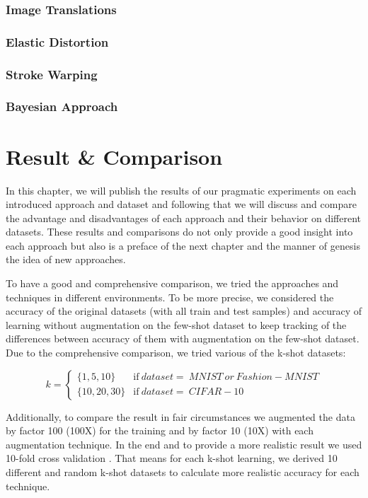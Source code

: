 \subsection{Image Translations}
\subsection{Elastic Distortion}
\subsection{Stroke Warping}
\subsection{Bayesian Approach}


\chapter{Result \& Comparison}
\label{tit:results}
In this chapter, we will publish the results of our pragmatic experiments on each introduced
approach and dataset and following that we will discuss and compare the advantage and disadvantages
of each approach and their behavior on different datasets. These results and comparisons do not only
provide a good insight into each approach but also is a preface of the next chapter and the manner
of genesis the idea of new approaches. 

To have a good and comprehensive comparison, we tried the approaches and techniques in different
environments. To be more precise, we considered the accuracy of the original datasets (with all
train and test samples) and accuracy of learning without augmentation on the few-shot dataset to
keep tracking of the differences between accuracy of them with augmentation on the few-shot dataset.
Due to the comprehensive comparison, we tried various of the k-shot datasets: 

\begin{equation}
  k=
  \begin{cases}
    \{1, 5, 10\}  & \text{if}\ dataset= 
    \ MNIST \ or \ Fashion-MNIST \\
    \{10, 20, 30\} & \text{if}\ dataset= \ CIFAR-10
  \end{cases}
\end{equation}

Additionally, to compare the result in fair circumstances we augmented the data by factor 100 (100X)
for the training and by factor 10 (10X) with each augmentation technique. In the end and to provide
a more realistic result we used 10-fold cross validation \cite{cross_validation}. That means for each k-shot learning, we
derived 10 different and random k-shot datasets to calculate more realistic accuracy for each
technique.

